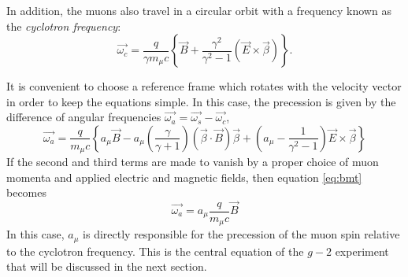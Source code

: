 \documentclass{outhesis}
\begin{document}
In addition, the muons also travel in a circular orbit with a frequency known as the \emph{cyclotron frequency}:
\begin{equation}
\overrightarrow{\omega_c} = \frac{q}{\gamma m_{\mu}c}\left\{\overrightarrow{B} + \frac{\gamma^2}{\gamma^2-1} \left(\overrightarrow{E} \times \overrightarrow{\beta}\right)\right\}.
\label{eq:c}
\end{equation}

It is convenient to choose a reference frame which rotates with the velocity vector in order to keep the equations simple. In this case, the precession is given by the difference of angular frequencies $\overrightarrow{\omega_a} = \overrightarrow{\omega_s} - \overrightarrow{\omega_c}$, 
\begin{equation}
\overrightarrow{\omega_a} =   \frac{q}{m_{\mu}c}\left\{a_{\mu}\overrightarrow{B}   -   a_{\mu}\left(\frac{\gamma}{\gamma + 1}\right)\left(\overrightarrow{\beta} \cdot \overrightarrow{B}\right)\overrightarrow{\beta} +   \left(a_{\mu}-\frac{1}{\gamma^2 - 1}\right)\overrightarrow{E} \times\overrightarrow{\beta}                 \right\}
\label{eq:bmt}
 \end{equation}
If the second and third terms are made to vanish by a proper choice of muon momenta and applied electric and magnetic fields, then equation \ref{eq:bmt} becomes
\begin{equation}
\overrightarrow{\omega_a} =   a_{\mu}\frac{q}{m_{\mu}c}\overrightarrow{B} 
\label{eq:wa}
\end{equation}
In this case, $a_{\mu}$ is directly responsible for the precession of the muon spin relative to the cyclotron frequency. This is the central equation of the $g-2$ experiment that will be discussed in the next section. 
\end{document}
